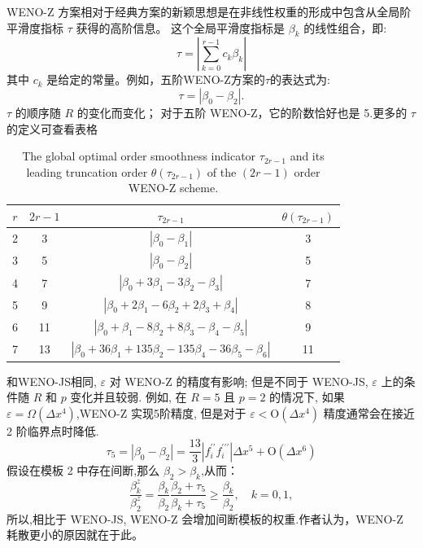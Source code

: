 \documentclass{book}
\begin{document}
WENO-Z 方案相对于经典方案的新颖思想是在非线性权重的形成中包含从全局阶平滑度指标 $\tau$ 获得的高阶信息。 这个全局平滑度指标是 $\beta_{k}$ 的线性组合，即:
\begin{equation}
    \tau=\left|\sum_{k=0}^{r-1} c_{k} \beta_{k}\right|
\end{equation}
其中 $c_{k}$ 是给定的常量。例如，五阶WENO-Z方案的$\tau$的表达式为:
\begin{equation}
    \tau=\left|\beta_{0}-\beta_{2}\right| .
\end{equation}
$\tau$ 的顺序随 $R$ 的变化而变化； 对于五阶 WENO-Z，它的阶数恰好也是 5.更多的 $\tau$ 的定义可查看表格\cite{WENO-Z-2013}
\begin{table}[htbp]
    \centering
    \label{table:tau_ref}
    \caption{The global optimal order smoothness indicator  $\tau_{2 r-1}$  and its leading truncation order  $\theta\left(\tau_{2 r-1}\right)$  of the  $(2 r-1)$  order WENO-Z scheme.}
    \begin{tabular}{cccc}
        \toprule
        $r$ & $2r-1$ & $\tau_{2r-1}$                                                 & $\theta(\tau_{2r-1})$ \\
        \midrule
        2   & 3      & $|\beta_0-\beta_1|$                                           & 3                     \\
        3   & 5      & $|\beta_0-\beta_2|$                                           & 5                     \\
        4   & 7      & $|\beta_0+3\beta_1-3\beta_2-\beta_3|$                         & 7                     \\
        5   & 9      & $|\beta_0+2\beta_1-6\beta_2+2\beta_3+\beta_4|$                & 8                     \\
        6   & 11     & $|\beta_0+\beta_1-8\beta_2+8\beta_3-\beta_4-\beta_5|$         & 9                     \\
        7   & 13     & $|\beta_0+36\beta_1+135\beta_2-135\beta_4-36\beta_5-\beta_6|$ & 11                    \\
        \bottomrule
    \end{tabular}
\end{table}

和WENO-JS相同,  $\varepsilon$  对 WENO-Z 的精度有影响; 但是不同于 WENO-JS, $\varepsilon$ 上的条件随 $R$ 和 $p$ 变化并且较弱. 例如, 在  $R=5$  且  $p=2$ 的情况下, 如果 $ \varepsilon=\Omega\left(\Delta x^{4}\right)$,WENO-Z 实现5阶精度, 但是对于  $\varepsilon<\mathrm{O}\left(\Delta x^{4}\right)$  精度通常会在接近 2 阶临界点时降低.
\begin{equation}
    \tau_{5}=\left|\beta_{0}-\beta_{2}\right|=\frac{13}{3}\left|f_{i}^{\prime \prime} f_{i}^{\prime \prime \prime}\right| \Delta x^{5}+\mathrm{O}\left(\Delta x^{6}\right)
\end{equation}
假设在模板 2 中存在间断,那么 $\beta_2>\beta_k$,从而：
\begin{equation}
    \frac{\beta_{k}^{z}}{\beta_{2}^{z}}=\frac{\beta_{k}}{\beta_{2}} \frac{\beta_{2}+\tau_{5}}{\beta_{k}+\tau_{5}} \geqslant \frac{\beta_{k}}{\beta_{2}}, \quad k=0,1,
\end{equation}
所以,相比于 WENO-JS, WENO-Z 会增加间断模板的权重.作者认为，WENO-Z 耗散更小的原因就在于此。
\end{document}
